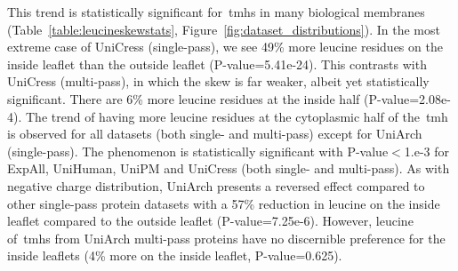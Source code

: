 This trend is statistically significant for~\gls{tmh}s in many biological membranes (Table~\ref{table:leucineskewstats}, Figure~\ref{fig:dataset_distributions}).
In the most extreme case of UniCress (single-pass), we see 49\% more leucine residues on the inside leaflet than the outside leaflet (P-value=5.41e-24).
This contrasts with UniCress (multi-pass), in which the skew is far weaker, albeit yet statistically significant.
There are 6\% more leucine residues at the inside half (P-value=2.08e-4).
The trend of having more leucine residues at the cytoplasmic half of the~\gls{tmh} is observed for all datasets (both single- and multi-pass) except for UniArch (single-pass).
The phenomenon is statistically significant with P-value$<$1.e-3 for ExpAll, UniHuman, UniPM and UniCress (both single- and multi-pass).
As with negative charge distribution, UniArch presents a reversed effect compared to other single-pass protein datasets with a 57\% reduction in leucine on the inside leaflet compared to the outside leaflet (P-value=7.25e-6).
However, leucine of~\gls{tmh}s from UniArch multi-pass proteins have no discernible preference for the inside leaflets (4\% more on the inside leaflet, P-value=0.625).

